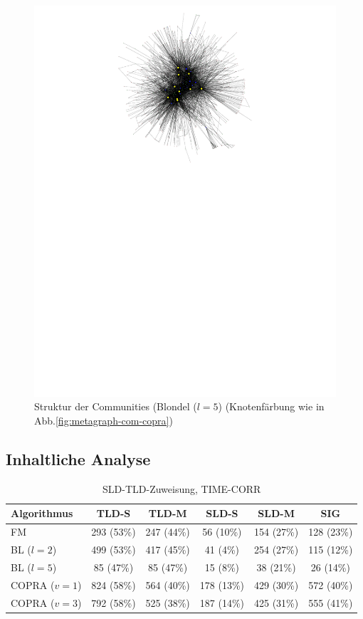 \begin{figure}[h!]
  \centering
  \includegraphics[scale=1.6]{images/metagraph-blondel2-minsize4.pdf}
  \caption{Struktur der Communities (Blondel ($l=5$) (Knotenf\"arbung
    wie in Abb.\ref{fig:metagraph-com-copra})}
  \label{fig:metagraph-com-blondel2}
\end{figure}

\subsection{Inhaltliche Analyse}
\label{sec:inhaltliche-analyse}

\begin{table}[t]
  \centering
  \footnotesize
  \begin{tabular}{l|c|c|c|c|c}
    Algorithmus & TLD-S & TLD-M & SLD-S & SLD-M & SIG \\
    \hline
    FM & 293 (53\%) & 247 (44\%) & 56 (10\%) & 154 (27\%) & 128
    (23\%) \\
    \hline
    BL ($l=2$) & 499 (53\%) & 417 (45\%) & 41 (4\%) & 254 (27\%) & 115 (12\%) \\
    BL ($l=5$) & 85 (47\%) & 85 (47\%) & 15 (8\%) & 38 (21\%) & 26 (14\%) \\
    \hline
    COPRA ($v=1$) & 824 (58\%) & 564 (40\%) & 178 (13\%) & 429 (30\%)
    & 572 (40\%) \\
    COPRA ($v=3$) & 792 (58\%) & 525 (38\%) & 187 (14\%) & 425 (31\%) & 555
    (41\%)
  \end{tabular}
  \caption{SLD-TLD-Zuweisung, TIME-CORR}
  \label{tab:assign}
\end{table}

